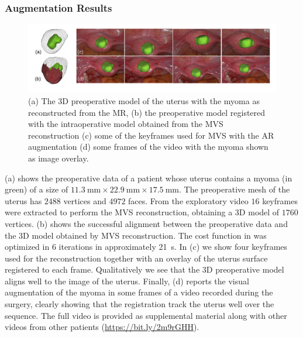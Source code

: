 \subsubsection{Augmentation Results}
\begin{figure}[t]
  \centering
  \includegraphics[width=\textwidth]{./figs/frames_aug_new.pdf}
\caption{(a) The 3D preoperative model of the uterus with the  myoma as reconstructed from the MR, (b) the preoperative model registered with the intraoperative model obtained from the MVS reconstruction (c) some of the keyframes used for MVS with the AR augmentation  (d) some frames of the video with the myoma shown as image overlay.}
\label{fig:myomas}
\end{figure}
(a) shows the preoperative data of a patient whose uterus contains a myoma (in green) of a size of $\SI{11.3}{\milli\metre}\times\SI{22.9}{\milli\metre}\times\SI{17.5}{\milli\metre}$. The preoperative mesh of the uterus has $2488$ vertices and $4972$ faces. 
From the exploratory video $16$ keyframes were extracted to perform the MVS reconstruction, obtaining a 3D model of $1760$ vertices.
(b) shows the successful alignment between the preoperative data and the 3D model obtained by MVS reconstruction. The cost function in  was optimized in $6$ iterations in approximately \SI{21}{\second}. 
In (c) we show four keyframes used for the reconstruction together with an overlay of the uterus surface registered to each frame. Qualitatively we see that the 3D preoperative model aligns well to the image of the uterus.
Finally, (d) reports the visual augmentation of the myoma in some frames of a video recorded during the surgery, clearly showing that the registration track the uterus well over the sequence. 
The full video is provided as supplemental material along with other videos from other patients (\url{https://bit.ly/2m9rGHH}).


